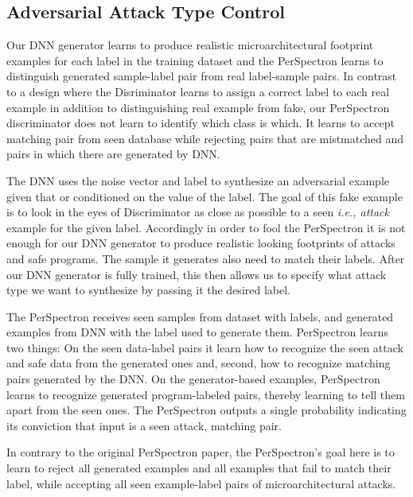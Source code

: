  




\subsection{Adversarial Attack Type Control}
 Our DNN generator learns to produce realistic microarchitectural footprint examples for each label in the training dataset and the PerSpectron learns to distinguish generated sample-label pair from real label-sample pairs.   
 In contrast to a design where the Disriminator learns to assign a correct label to each real example in addition to distinguishing real example from fake, our PerSpectron discriminator does not learn to identify which class is which.  It learns to accept matching pair from seen database while rejecting pairs that are mistmatched and pairs in which there are generated by DNN. 
 
 The DNN uses the noise vector and label to synthesize an adversarial example given that or conditioned on the value of the label. The goal of this fake example is to look in the eyes of Discriminator as close as possible to a seen {\em i.e., attack} example for the given label.  
 Accordingly in order to fool the PerSpectron it is not enough for our DNN generator to produce realistic looking footprints of attacks and safe programs. The sample it generates also need to match their labels. After our DNN generator is fully trained, this then allows us to specify what attack type we want to synthesize by passing it the desired label. 
 
 The PerSpectron receives seen samples from dataset  with labels, and generated examples from DNN with the label used to generate them.  PerSpectron learns two things: 
 On the seen data-label pairs it learn
 how to recognize the seen attack and safe data from the generated ones and, second, how to recognize matching pairs generated by the DNN. On the generator-based examples, PerSpectron learns to recognize generated program-labeled pairs, thereby learning to tell them apart from the seen ones. The PerSpectron outputs a single probability indicating its conviction that input is a seen attack, matching pair. 
 
\begin{note}
{In contrary to the original PerSpectron paper, the PerSpectron's goal here is to learn to reject all generated examples and all examples that fail to match their label, while accepting all seen example-label pairs of microarchitectural attacks.}
 \end{note}
 

